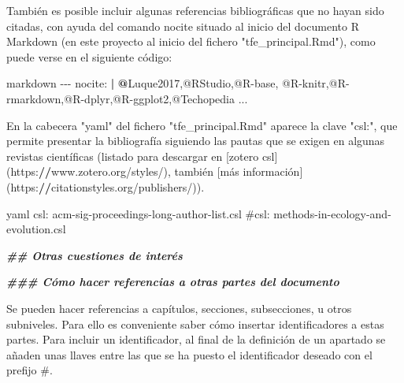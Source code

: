 \documentclass[11pt,a4paper,oneside,]{article}
\newenvironment{Shaded}{\begin{snugshade}}{\end{snugshade}}
\newcommand{\AttributeTok}[1]{\textcolor[rgb]{0.77,0.63,0.00}{#1}}
\newcommand{\DocumentationTok}[1]{\textcolor[rgb]{0.56,0.35,0.01}{\textbf{\textit{#1}}}}
\newcommand{\ErrorTok}[1]{\textcolor[rgb]{0.64,0.00,0.00}{\textbf{#1}}}
\newcommand{\FunctionTok}[1]{\textcolor[rgb]{0.00,0.00,0.00}{#1}}
\newcommand{\NormalTok}[1]{#1}
\newcommand{\SpecialCharTok}[1]{\textcolor[rgb]{0.00,0.00,0.00}{#1}}
\newcommand{\StringTok}[1]{\textcolor[rgb]{0.31,0.60,0.02}{#1}}
\numberwithin{dummy}{section}
\theoremstyle{ocrenumbox}
\theoremstyle{blacknumex}
\theoremstyle{blacknumbox}
\theoremstyle{ocrenum}
\theoremstyle{ocrenum}
\begin{document}
\begin{Shaded}
\begin{Highlighting}[numbers=left,,firstnumber=1101,]
\NormalTok{También es posible incluir algunas referencias bibliográficas que no hayan sido citadas, con ayuda del comando }\StringTok{\textasciigrave{}}\AttributeTok{nocite}\StringTok{\textasciigrave{}}\NormalTok{ situado al inicio del documento R }\FunctionTok{Markdown}\NormalTok{ (en este proyecto al inicio del fichero }\StringTok{"tfe\_principal.Rmd"}\NormalTok{), como puede verse en el siguiente código}\SpecialCharTok{:}

\StringTok{\textasciigrave{}\textasciigrave{}\textasciigrave{}\textasciigrave{}}\NormalTok{markdown}
\SpecialCharTok{{-}{-}{-}}
\NormalTok{nocite}\SpecialCharTok{:} \ErrorTok{|} 
  \ErrorTok{@}\NormalTok{Luque2017,}\SpecialCharTok{@}\NormalTok{RStudio,}\SpecialCharTok{@}\NormalTok{R}\SpecialCharTok{{-}}\NormalTok{base,}
  \SpecialCharTok{@}\NormalTok{R}\SpecialCharTok{{-}}\NormalTok{knitr,}\SpecialCharTok{@}\NormalTok{R}\SpecialCharTok{{-}}\NormalTok{rmarkdown,}\SpecialCharTok{@}\NormalTok{R}\SpecialCharTok{{-}}\NormalTok{dplyr,}\SpecialCharTok{@}\NormalTok{R}\SpecialCharTok{{-}}\NormalTok{ggplot2,}\SpecialCharTok{@}\NormalTok{Techopedia}
\NormalTok{...}

\StringTok{\textasciigrave{}\textasciigrave{}\textasciigrave{}\textasciigrave{}}


\NormalTok{En la cabecera }\StringTok{"yaml"}\NormalTok{ del fichero }\StringTok{"tfe\_principal.Rmd"}\NormalTok{ aparece la clave }\StringTok{"csl:"}\NormalTok{, que permite presentar la bibliografía siguiendo las pautas que se exigen en algunas revistas científicas (listado para descargar en [zotero csl](https}\SpecialCharTok{:}\ErrorTok{//}\NormalTok{www.zotero.org}\SpecialCharTok{/}\NormalTok{styles}\SpecialCharTok{/}\NormalTok{), también [más información](https}\SpecialCharTok{:}\ErrorTok{//}\NormalTok{citationstyles.org}\SpecialCharTok{/}\NormalTok{publishers}\SpecialCharTok{/}\NormalTok{)).}

\StringTok{\textasciigrave{}\textasciigrave{}\textasciigrave{}}\AttributeTok{yaml}
\AttributeTok{csl: acm{-}sig{-}proceedings{-}long{-}author{-}list.csl}
\AttributeTok{\#csl: methods{-}in{-}ecology{-}and{-}evolution.csl}
\StringTok{\textasciigrave{}\textasciigrave{}\textasciigrave{}}



\DocumentationTok{\#\# Otras cuestiones de interés}

\DocumentationTok{\#\#\# Cómo hacer referencias a otras partes del documento}

\NormalTok{Se pueden hacer referencias a capítulos, secciones, subsecciones, u otros subniveles. Para ello es conveniente saber cómo insertar identificadores a estas partes. Para incluir un identificador,}
\NormalTok{al final de la definición de un apartado se añaden unas llaves entre las que se ha puesto el identificador deseado con el prefijo }\StringTok{\textasciigrave{}}\AttributeTok{\#}\StringTok{\textasciigrave{}}\NormalTok{. }


\end{Highlighting}
\end{Shaded}
\end{document}
